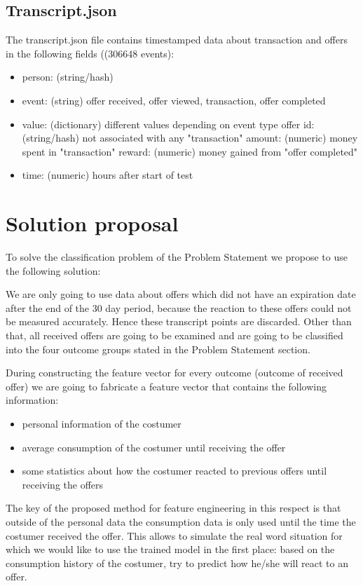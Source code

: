 \documentclass[10pt,oneside,a4paper]{report}
\begin{document}
\subsection*{Transcript.json}
The transcript.json file contains timestamped data about transaction and offers in the following fields ((306648 events):
\begin{itemize}
	\item person: (string/hash)
	\item event: (string) offer received, offer viewed, transaction, offer completed
	\item value: (dictionary) different values depending on event type
		\subitem offer id: (string/hash) not associated with any "transaction"
		\subitem amount: (numeric) money spent in "transaction"
		\subitem reward: (numeric) money gained from "offer completed"
	\item time: (numeric) hours after start of test
\end{itemize}

\section*{Solution proposal}

To solve the classification problem of the Problem Statement we propose to use the following solution:

We are only going to use data about offers which did not have an expiration date after the end of the 30 day period, because the reaction to these offers could not be measured accurately. Hence these transcript points are discarded. Other than that, all received offers are going to be examined and are going to be classified into the four outcome groups stated in the Problem Statement section. 

During constructing the feature vector for every outcome (outcome of received offer) we are going to fabricate a feature vector that contains the following information:
\begin{itemize}
	\item personal information of the costumer
	\item average consumption of the costumer until receiving the offer
	\item some statistics about how the costumer reacted to previous offers until receiving the offers
\end{itemize}

The key of the proposed method for feature engineering in this respect is that outside of the personal data the consumption data is only used until the time the costumer received the offer. This allows to simulate the real word situation for which we would like to use the trained model in the first place: based on the consumption history of the costumer, try to predict how he/she will react to an offer. 
\end{document}
